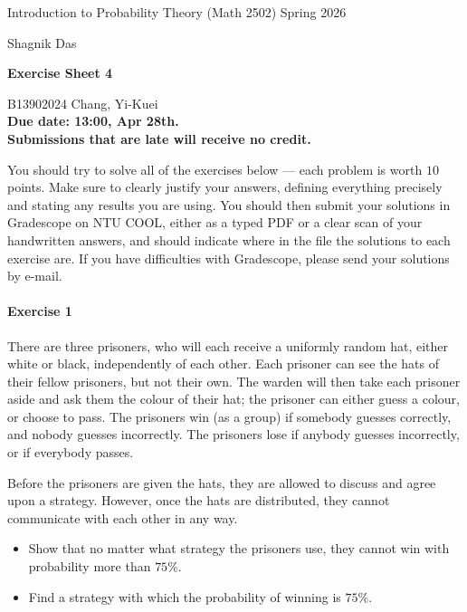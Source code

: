 \documentclass[a4paper,12pt]{article}
\newcommand{\courseTitle}{Introduction to Probability Theory (Math 2502)}
\newcommand{\semester}{Spring 2026}
\newcommand{\instructorA}{Shagnik Das}
\newcommand{\instructorB}{}
\newcommand{\sheetNumber}{4}
\newcommand{\dueDate}{13:00, Apr 28th.}
\newcommand{\lateWarning}{Submissions that are late will receive no credit.}
\newcommand{\buildtitle}[4]{
\begin{flushleft}
{\large
#1
\hfill{}
#2
\par
#3
}
\end{flushleft}
\vskip 4pt
\begin{center}
{\large\bfseries#4\par}
\end{center}
\bigskip
}
\begin{document}
\buildtitle{\courseTitle{}}{\semester}{\instructorA{} \hfill \instructorB{}}{Exercise Sheet \sheetNumber{}}

\vspace{-0.2in}

\begin{center}

{B13902024 Chang, Yi-Kuei \\ \bf Due date: \dueDate \\ \lateWarning}

\end{center}

\noindent You should try to solve all of the exercises below --- each problem is worth $10$ points. Make sure to clearly justify your answers, defining everything precisely and stating any results you are using. You should then submit your solutions in Gradescope on NTU COOL, either as a typed PDF or a clear scan of your handwritten answers, and should indicate where in the file the solutions to each exercise are. If you have difficulties with Gradescope, please send your solutions by e-mail.

\paragraph{Exercise 1}  There are three prisoners, who will each receive a uniformly random hat, either white or black, independently of each other. Each prisoner can see the hats of their fellow prisoners, but not their own. The warden will then take each prisoner aside and ask them the colour of their hat; the prisoner can either guess a colour, or choose to pass. The prisoners win (as a group) if somebody guesses correctly, and nobody guesses incorrectly. The prisoners lose if anybody guesses incorrectly, or if everybody passes.

Before the prisoners are given the hats, they are allowed to discuss and agree upon a strategy. However, once the hats are distributed, they cannot communicate with each other in any way.

\begin{itemize}
	\item[(a)] Show that no matter what strategy the prisoners use, they cannot win with probability more than $75\%$.
	\item[(b)] Find a strategy with which the probability of winning is $75\%$.
\end{itemize}
\end{document}
